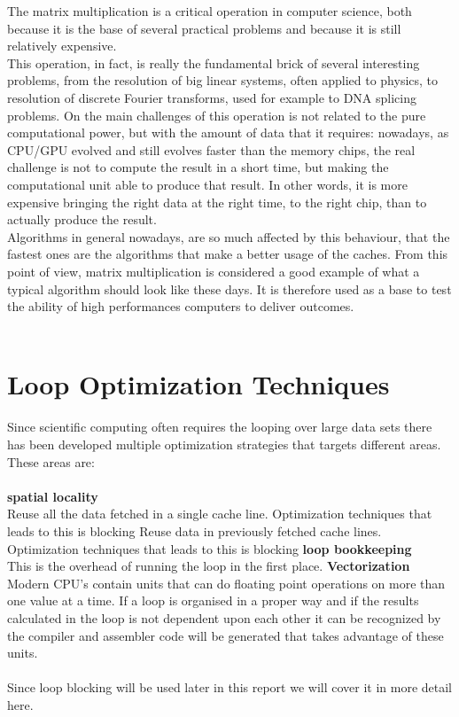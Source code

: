 The matrix multiplication is a critical operation in computer science, both because it is the base of several practical problems and because it is still relatively expensive. \\
This operation, in fact, is really the fundamental brick of several interesting problems, from the resolution of big linear systems, often applied to physics, to resolution of discrete Fourier transforms, used for example to DNA splicing problems.
On the main challenges of this operation is not related to the pure computational power, but with the amount of data that it requires: nowadays, as CPU/GPU evolved and still evolves faster than the memory chips, the real challenge is not to compute the result in a short time, but making the computational unit able to produce that result. In other words, it is more expensive bringing the right data at the right time, to the right chip, than to actually produce the result. \\
Algorithms in general nowadays, are so much affected by this behaviour, that the fastest ones are the algorithms that make a better usage of the caches.
From this point of view, matrix multiplication is considered a good example of what a typical algorithm should look like these days. It is therefore used as a base to test the ability of high performances computers to deliver outcomes. 
\\\\
\section{Loop Optimization Techniques}
Since scientific computing often requires the looping over large data sets there has been developed multiple optimization strategies that targets different areas. These areas are:
\\\\
\textbf{spatial locality}\\
Reuse all the data fetched in a single cache line. Optimization techniques that leads to this is blocking
Reuse data in previously fetched cache lines. Optimization techniques that leads to this is blocking
\textbf{loop bookkeeping}\\ 
This is the overhead of running the loop in the first place. 
\textbf{Vectorization}\\
Modern CPU's contain units that can do floating point operations on more than one value at a time. If a loop is organised in a proper way and if the results calculated in the loop is not dependent upon each other it can be recognized by the compiler and assembler code will be generated that takes advantage of these units.
\\\\
Since loop blocking will be used later in this report we will cover it in more detail here.
